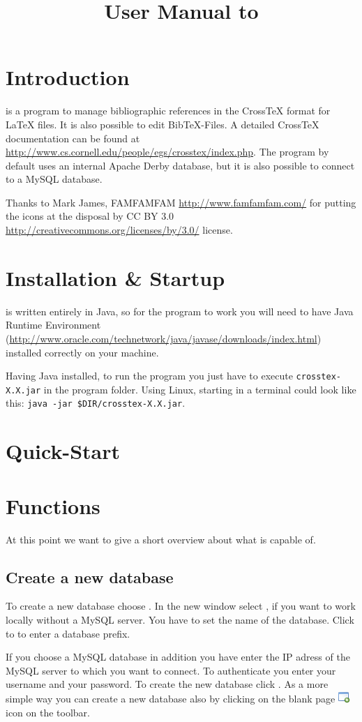 \documentclass[a4paper,10pt]{scrartcl}
\title{User Manual to \crossrefx}
\author{}
\date{}
\begin{document}
\maketitle
\tableofcontents
\section{Introduction}
\crossrefx is a program to manage bibliographic references in the CrossTeX
format for LaTeX files. It is also possible to edit BibTeX-Files.
A detailed CrossTeX documentation can be found at
\url{http://www.cs.cornell.edu/people/egs/crosstex/index.php}.
The program by default uses an internal Apache Derby database, but it is also
possible to connect to a MySQL database.

Thanks to Mark James, FAMFAMFAM  \url{http://www.famfamfam.com/} for putting the
icons at the disposal by CC BY 3.0
\url{http://creativecommons.org/licenses/by/3.0/} license.
\section{Installation \& Startup}
\crossrefx is written entirely in Java, so for the program to work you will need
to have Java Runtime Environment
(\url{http://www.oracle.com/technetwork/java/javase/downloads/index.html})
installed correctly on your machine.

Having Java installed, to run the program you just have to execute
\texttt{crosstex-X.X.jar} in the program folder. Using Linux, starting in a
terminal could look like this: \texttt{java -jar \$DIR/crosstex-X.X.jar}.
\section{Quick-Start}

\section{Functions}
At this point we want to give a short overview about what \crossrefx is capable
of.
\subsection{Create a new database}
To create a new database choose \clickpath{\file}{\newdatabase}.
In the new window select \internaldatabase, if you want to work locally without
a MySQL server. You have to set the name of the database. Click to \connectdb to
enter a database prefix.

If you choose a MySQL database in addition you have enter the IP adress of the
MySQL server to which you want to connect. To authenticate you enter your
username and your password. To create the new database click \ok. As a more
simple way you can create a new database also by clicking on the blank page
\includegraphics{./images/application_add.png} icon on the toolbar.
\end{document}

